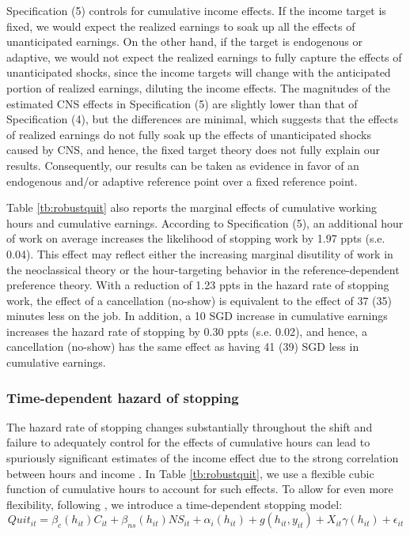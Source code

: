\documentclass[reviewmode,AEJ]{AEA}
\begin{document}
Specification (5) controls for cumulative income effects. If the income target is fixed, we would expect the realized earnings to soak up all the effects of unanticipated earnings. On the other hand, if the target is endogenous or adaptive, we would not expect the realized earnings to fully capture the effects of unanticipated shocks, since the income targets will change with the anticipated portion of realized earnings, diluting the income effects. The magnitudes of the estimated CNS effects in Specification (5) are slightly lower than that of Specification (4), but the differences 
are minimal, which suggests that the effects of realized earnings do not fully soak up the effects of unanticipated shocks caused by CNS, and hence, the fixed target theory does not fully explain our results. Consequently, our results can be taken as evidence in favor of an endogenous and/or adaptive reference point over a fixed reference point. 


Table \ref{tb:robustquit} also reports the marginal effects of cumulative working hours and cumulative earnings. According to Specification (5), an additional hour of work on average increases the likelihood of stopping work by 1.97 ppts (s.e. 0.04). This effect may reflect either the increasing marginal disutility of work in the neoclassical theory or the hour-targeting behavior in the reference-dependent preference theory. With a reduction of 1.23 ppts in the hazard rate of stopping work, the effect of a cancellation (no-show) is equivalent to the effect of 37 (35) minutes less on the job. %
In addition, a 10 SGD increase in cumulative earnings increases the hazard rate of stopping by 0.30 ppts (s.e. 0.02), and hence, a cancellation (no-show) has the same effect as having 41 (39) SGD less in cumulative earnings.%

\subsubsection{Time-dependent hazard of stopping}
The hazard rate of stopping changes substantially throughout the shift and failure to adequately control for the effects of cumulative hours can lead to spuriously significant estimates of the income effect due to the strong correlation between hours and income%
. In Table \ref{tb:robustquit}, we use a flexible cubic function of cumulative hours to account for such effects. To allow for even more flexibility, following \cite{thakral2018daily}, we introduce a time-dependent stopping model:
\begin{equation}
\label{eq:lwr}
    Quit_{it} = \beta_c(h_{it})C_{it} + \beta_{ns}(h_{it}){NS}_{it} + \alpha_i(h_{it}) + g(h_{it}, y_{it}) + X_{it}\gamma(h_{it}) + \epsilon_{it}
\end{equation}
\end{document}
